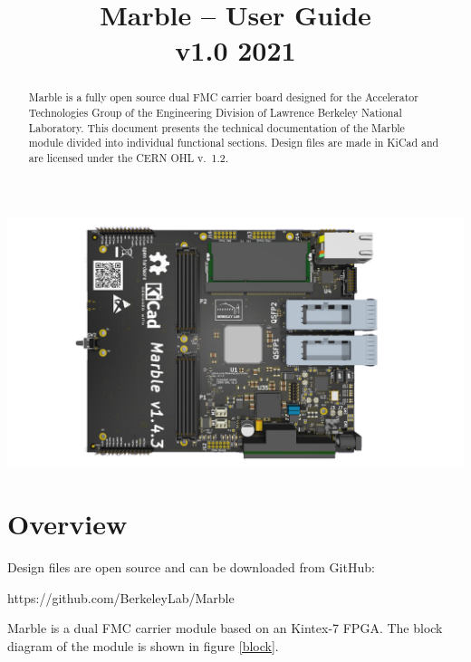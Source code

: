 \documentclass[12pt,oneside,a4]{article}
\title{Marble -- User Guide\\ \small{v1.0 2021}}
\author{}
\begin{document}
\maketitle
\begin{center}
\includegraphics[width=0.8\linewidth]{marble_top.png}
\end{center}
\begin{abstract}
Marble is a fully open source dual FMC carrier board designed for the Accelerator Technologies Group of the Engineering Division of Lawrence Berkeley National Laboratory. This document presents the technical documentation of the Marble module divided into individual functional sections.
Design files are made in KiCad and are licensed under the CERN OHL v.~1.2.
\end{abstract}

\clearpage
\tableofcontents

\clearpage

\section{Overview}

\begin{leftbar}
Design files are open source and can be downloaded from GitHub:

https://github.com/BerkeleyLab/Marble
\end{leftbar}

Marble is a dual FMC carrier module based on an Kintex-7 FPGA. The block diagram of the module is shown in figure \ref{block}.
\end{document}
